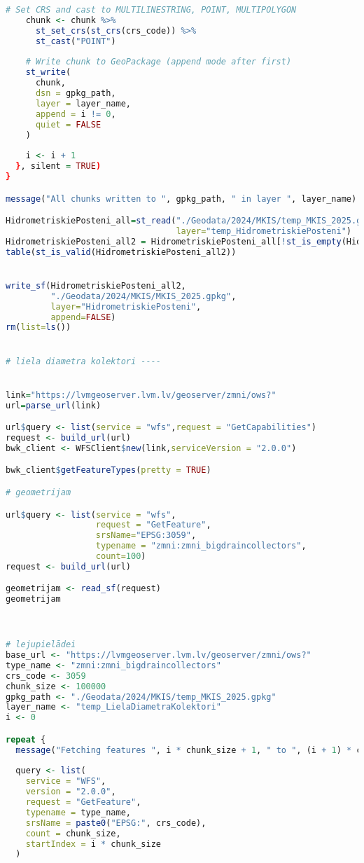 \documentclass[
]{book}
\begin{document}
\begin{lstlisting}[language=R]
    # Set CRS and cast to MULTILINESTRING, POINT, MULTIPOLYGON
    chunk <- chunk %>%
      st_set_crs(st_crs(crs_code)) %>%
      st_cast("POINT")
    
    # Write chunk to GeoPackage (append mode after first)
    st_write(
      chunk, 
      dsn = gpkg_path,
      layer = layer_name,
      append = i != 0,
      quiet = FALSE
    )
    
    i <- i + 1
  }, silent = TRUE)
}

message("All chunks written to ", gpkg_path, " in layer ", layer_name)

HidrometriskiePosteni_all=st_read("./Geodata/2024/MKIS/temp_MKIS_2025.gpkg",
                                  layer="temp_HidrometriskiePosteni")
HidrometriskiePosteni_all2 = HidrometriskiePosteni_all[!st_is_empty(HidrometriskiePosteni_all),,drop=FALSE] # 0
table(st_is_valid(HidrometriskiePosteni_all2))


write_sf(HidrometriskiePosteni_all2,
         "./Geodata/2024/MKIS/MKIS_2025.gpkg",
         layer="HidrometriskiePosteni",
         append=FALSE)
rm(list=ls())


# liela diametra kolektori ----


link="https://lvmgeoserver.lvm.lv/geoserver/zmni/ows?"
url=parse_url(link)

url$query <- list(service = "wfs",request = "GetCapabilities")
request <- build_url(url)
bwk_client <- WFSClient$new(link,serviceVersion = "2.0.0")

bwk_client$getFeatureTypes(pretty = TRUE)

# geometrijam

url$query <- list(service = "wfs",
                  request = "GetFeature",
                  srsName="EPSG:3059",
                  typename = "zmni:zmni_bigdraincollectors",
                  count=100)
request <- build_url(url)

geometrijam <- read_sf(request)
geometrijam



# lejupielādei
base_url <- "https://lvmgeoserver.lvm.lv/geoserver/zmni/ows?"
type_name <- "zmni:zmni_bigdraincollectors"
crs_code <- 3059
chunk_size <- 100000
gpkg_path <- "./Geodata/2024/MKIS/temp_MKIS_2025.gpkg"
layer_name <- "temp_LielaDiametraKolektori"
i <- 0

repeat {
  message("Fetching features ", i * chunk_size + 1, " to ", (i + 1) * chunk_size, "...")
  
  query <- list(
    service = "WFS",
    version = "2.0.0",
    request = "GetFeature",
    typename = type_name,
    srsName = paste0("EPSG:", crs_code),
    count = chunk_size,
    startIndex = i * chunk_size
  )
  

\end{lstlisting}
\end{document}
